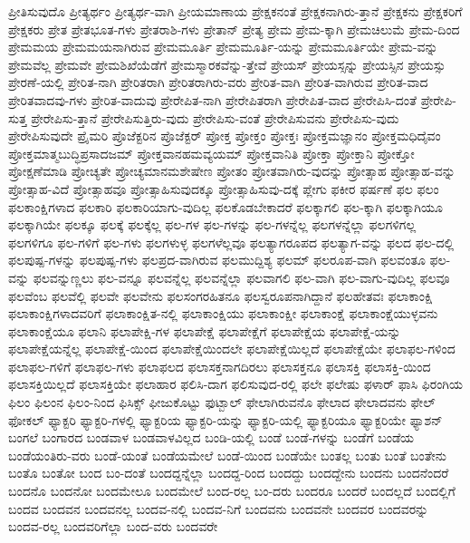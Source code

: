 {ಪ್ರೀತಿಸುವುದೊ
ಪ್ರೀತ್ಯರ್ಥಂ
ಪ್ರೀತ್ಯರ್ಥ-ವಾಗಿ
ಪ್ರೀಯಮಾಣಾಯ
ಪ್ರೇಕ್ಷಕನಂತೆ
ಪ್ರೇಕ್ಷಕನಾಗಿರು-ತ್ತಾನೆ
ಪ್ರೇಕ್ಷಕನು
ಪ್ರೇಕ್ಷಕರಿಗೆ
ಪ್ರೇಕ್ಷಕರು
ಪ್ರೇತ
ಪ್ರೇತಭೂತ-ಗಳು
ಪ್ರೇತರಾಶಿ-ಗಳು
ಪ್ರೇತಾನ್
ಪ್ರೇತ್ಯ
ಪ್ರೇಮ
ಪ್ರೇಮ-ಕ್ಕಾಗಿ
ಪ್ರೇಮಚಿಲುಮೆ
ಪ್ರೇಮ-ದಿಂದ
ಪ್ರೇಮಮಯ
ಪ್ರೇಮಮಯನಾಗಿರುವ
ಪ್ರೇಮಮೂರ್ತಿ
ಪ್ರೇಮಮೂರ್ತಿ-ಯನ್ನು
ಪ್ರೇಮಮೂರ್ತಿಯೇ
ಪ್ರೇಮ-ವನ್ನು
ಪ್ರೇಮವೆಲ್ಲ
ಪ್ರೇಮವೇ
ಪ್ರೇಮಶಿಖೆಯೆಡೆಗೆ
ಪ್ರೇಮಸ್ಮಾರಕವೆನ್ನು-ತ್ತೇವೆ
ಪ್ರೇಯಸ್
ಪ್ರೇಯಸ್ಸನ್ನು
ಪ್ರೇಯಸ್ಸಿನ
ಪ್ರೇಯಸ್ಸು
ಪ್ರೇರಣೆ-ಯಲ್ಲಿ
ಪ್ರೇರಿತ-ನಾಗಿ
ಪ್ರೇರಿತರಾಗಿ
ಪ್ರೇರಿತರಾಗಿರು-ವರು
ಪ್ರೇರಿತ-ವಾಗಿ
ಪ್ರೇರಿತ-ವಾಗಿರುವ
ಪ್ರೇರಿತ-ವಾದ
ಪ್ರೇರಿತವಾದವು-ಗಳು
ಪ್ರೇರಿತ-ವಾದುವು
ಪ್ರೇರೇಪಿತ-ನಾಗಿ
ಪ್ರೇರೇಪಿತರಾಗಿ
ಪ್ರೇರೇಪಿತ-ವಾದ
ಪ್ರೇರೇಪಿಸಿ-ದಂತೆ
ಪ್ರೇರೇಪಿ-ಸುತ್ತ
ಪ್ರೇರೇಪಿಸು-ತ್ತಾನೆ
ಪ್ರೇರೇಪಿಸುತ್ತಿರು-ವುದು
ಪ್ರೇರೇಪಿಸು-ವಂತೆ
ಪ್ರೇರೇಪಿಸುವನು
ಪ್ರೇರೇಪಿಸು-ವುದು
ಪ್ರೇರೇಪಿಸುವುದೇ
ಪ್ರೈಮರಿ
ಪ್ರೊಜೆಕ್ಟರಿನ
ಪ್ರೊಜೆಕ್ಟರ್
ಪ್ರೋಕ್ತ
ಪ್ರೋಕ್ತಂ
ಪ್ರೋಕ್ತಃ
ಪ್ರೋಕ್ತಮಜ್ಞಾನಂ
ಪ್ರೋಕ್ತಮಧಿದೈವಂ
ಪ್ರೋಕ್ತಮಾತ್ಮಬುದ್ಧಿಪ್ರಸಾದಜಮ್
ಪ್ರೋಕ್ತವಾನಹಮವ್ಯಯಮ್
ಪ್ರೋಕ್ತವಾನಿತಿ
ಪ್ರೋಕ್ತಾ
ಪ್ರೋಕ್ತಾನಿ
ಪ್ರೋಕ್ತೋ
ಪ್ರೋಕ್ಷಣೆಮಾಡಿ
ಪ್ರೋಚ್ಯತೇ
ಪ್ರೋಚ್ಯಮಾನಮಶೇಷೇಣ
ಪ್ರೋತಂ
ಪ್ರೋತವಾಗಿರು-ವುದನ್ನು
ಪ್ರೋತ್ಸಾಹ
ಪ್ರೋತ್ಸಾಹ-ವನ್ನು
ಪ್ರೋತ್ಸಾಹ-ವಿದೆ
ಪ್ರೋತ್ಸಾಹವೂ
ಪ್ರೋತ್ಸಾಹಿಸುವುದಕ್ಕೂ
ಪ್ರೋತ್ಸಾಹಿಸುವು-ದಕ್ಕೆ
ಪ್ಲೇಗು
ಫಕೀರ
ಫರ್ಷಣೆ
ಫಲ
ಫಲಂ
ಫಲಕಾಂಕ್ಷಿಗಳಾದ
ಫಲಕಾರಿ
ಫಲಕಾರಿಯಾಗು-ವುದಿಲ್ಲ
ಫಲಕೊಡಬೇಕಾದರೆ
ಫಲಕ್ಕಾಗಲಿ
ಫಲ-ಕ್ಕಾಗಿ
ಫಲಕ್ಕಾಗಿಯೂ
ಫಲಕ್ಕಾಗಿಯೇ
ಫಲಕ್ಕೂ
ಫಲಕ್ಕೆ
ಫಲಕ್ಕೆಲ್ಲ
ಫಲ-ಗಳ
ಫಲ-ಗಳನ್ನು
ಫಲ-ಗಳನ್ನೆಲ್ಲ
ಫಲಗಳನ್ನೆಲ್ಲಾ
ಫಲಗಳಿಗಲ್ಲ
ಫಲಗಳಿಗೂ
ಫಲ-ಗಳಿಗೆ
ಫಲ-ಗಳು
ಫಲಗಳುಳ್ಳ
ಫಲಗಳೆಲ್ಲವೂ
ಫಲತ್ಯಾಗರೂಪದ
ಫಲತ್ಯಾಗ-ವನ್ನು
ಫಲದ
ಫಲ-ದಲ್ಲಿ
ಫಲಪುಷ್ಪ-ಗಳನ್ನು
ಫಲಪುಷ್ಪ-ಗಳು
ಫಲಪ್ರದ-ವಾಗಿರುವ
ಫಲಮುದ್ದಿಶ್ಯ
ಫಲಮ್
ಫಲರೂಪ-ವಾಗಿ
ಫಲವಂತೂ
ಫಲ-ವನ್ನು
ಫಲವನ್ನುಣ್ಣಲು
ಫಲ-ವನ್ನೂ
ಫಲವನ್ನೆಲ್ಲ
ಫಲವನ್ನೆಲ್ಲಾ
ಫಲವಾಗಲಿ
ಫಲ-ವಾಗಿ
ಫಲ-ವಾಗು-ವುದಿಲ್ಲ
ಫಲವೂ
ಫಲವೆಂಬ
ಫಲವೆಲ್ಲಿ
ಫಲವೇ
ಫಲವೇನು
ಫಲಸಂಗರಹಿತನೂ
ಫಲಸ್ವರೂಪನಾಗಿದ್ದಾನೆ
ಫಲಹೇತವಃ
ಫಲಾಕಾಂಕ್ಷಿ
ಫಲಾಕಾಂಕ್ಷಿಗಳಾದವರಿಗೆ
ಫಲಾಕಾಂಕ್ಷಿತ-ನಲ್ಲಿ
ಫಲಾಕಾಂಕ್ಷಿಯು
ಫಲಾಕಾಂಕ್ಷೀ
ಫಲಾಕಾಂಕ್ಷೆ
ಫಲಾಕಾಂಕ್ಷೆಯುಳ್ಳವನು
ಫಲಾಕಾಂಕ್ಷೆಯೂ
ಫಲಾನಿ
ಫಲಾಪೇಕ್ಷಿ-ಗಳ
ಫಲಾಪೇಕ್ಷೆ
ಫಲಾಪೇಕ್ಷೆಗೆ
ಫಲಾಪೇಕ್ಷೆಯ
ಫಲಾಪೇಕ್ಷೆ-ಯನ್ನು
ಫಲಾಪೇಕ್ಷೆಯನ್ನೆಲ್ಲ
ಫಲಾಪೇಕ್ಷೆ-ಯಿಂದ
ಫಲಾಪೇಕ್ಷೆಯಿಂದಲೇ
ಫಲಾಪೇಕ್ಷೆಯಿಲ್ಲದೆ
ಫಲಾಪೇಕ್ಷೆಯೇ
ಫಲಾಫಲ-ಗಳಿಂದ
ಫಲಾಫಲ-ಗಳಿಗೆ
ಫಲಾಫಲ-ಗಳು
ಫಲಾಫಲದ
ಫಲಾಸಕ್ತನಾಗದಿರಲು
ಫಲಾಸಕ್ತನೂ
ಫಲಾಸಕ್ತಿ
ಫಲಾಸಕ್ತಿ-ಯಿಂದ
ಫಲಾಸಕ್ತಿಯಿಲ್ಲದೆ
ಫಲಾಸಕ್ತಿಯೇ
ಫಲಾಹಾರ
ಫಲಿಸಿ-ದಾಗ
ಫಲಿಸುವುದ-ರಲ್ಲಿ
ಫಲೇ
ಫಲೇಷು
ಫಳಾರ್
ಫಾಸಿ
ಫಿರಂಗಿಯ
ಫಿಲಂ
ಫಿಲಂನ
ಫಿಲಂ-ನಿಂದ
ಫಿಸಿಕ್ಸ್
ಫೀಜುಕೊಟ್ಟು
ಫುಟ್ಬಾಲ್
ಫೇಲಾಗಿರುವನೊ
ಫೇಲಾದ
ಫೇಲಾದವನು
ಫೇಲ್
ಫೋಕಲ್
ಫ್ಯಾಕ್ಟರಿ
ಫ್ಯಾಕ್ಟರಿ-ಗಳಲ್ಲಿ
ಫ್ಯಾಕ್ಟರಿಯ
ಫ್ಯಾಕ್ಟರಿ-ಯನ್ನು
ಫ್ಯಾಕ್ಟರಿ-ಯಲ್ಲಿ
ಫ್ಯಾಕ್ಟರಿಯೂ
ಫ್ಯಾಕ್ಟರಿಯೇ
ಫ್ಯಾಶನ್
ಬಂಗಲೆ
ಬಂಗಾರದ
ಬಂಡವಾಳ
ಬಂಡವಾಳವಿಲ್ಲದ
ಬಂಡಿ-ಯಲ್ಲಿ
ಬಂಡೆ
ಬಂಡೆ-ಗಳನ್ನು
ಬಂಡೆಗೆ
ಬಂಡೆಯ
ಬಂಡೆಯಂತಿರು-ವರು
ಬಂಡೆ-ಯಂತೆ
ಬಂಡೆಯಮೇಲೆ
ಬಂಡೆ-ಯಿಂದ
ಬಂಡೆಯೇ
ಬಂತಲ್ಲ
ಬಂತು
ಬಂತೆ
ಬಂತೇನು
ಬಂತೊ
ಬಂತೋ
ಬಂದ
ಬಂ-ದಂತೆ
ಬಂದದ್ದನ್ನೆಲ್ಲಾ
ಬಂದದ್ದ-ರಿಂದ
ಬಂದದ್ದು
ಬಂದದ್ದೇನು
ಬಂದನು
ಬಂದನೆಂದರೆ
ಬಂದನೊ
ಬಂದನೋ
ಬಂದಮೇಲೂ
ಬಂದಮೇಲೆ
ಬಂದ-ರಲ್ಲ
ಬಂ-ದರು
ಬಂದರೂ
ಬಂದರೆ
ಬಂದಲ್ಲದೆ
ಬಂದಲ್ಲಿಗೆ
ಬಂದವ
ಬಂದವನ
ಬಂದವನಲ್ಲ
ಬಂದವ-ನಲ್ಲಿ
ಬಂದವ-ನಿಗೆ
ಬಂದವನು
ಬಂದವನೇ
ಬಂದವರ
ಬಂದವರನ್ನು
ಬಂದವ-ರಲ್ಲ
ಬಂದವರಿಗೆಲ್ಲಾ
ಬಂದ-ವರು
ಬಂದವರೇ
}
